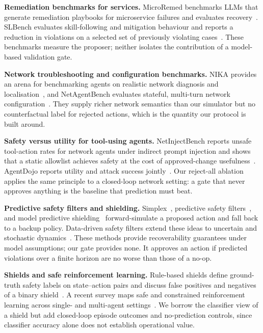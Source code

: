 \documentclass[conference]{IEEEtran}
\begin{document}
\textbf{Remediation benchmarks for services.} MicroRemed benchmarks LLMs that generate remediation playbooks for microservice failures and evaluates recovery~\cite{microremed}. SLBench evaluates skill-following and mitigation behaviour and reports a reduction in violations on a selected set of previously violating cases~\cite{slbench}. These benchmarks measure the proposer; neither isolates the contribution of a model-based validation gate.

\textbf{Network troubleshooting and configuration benchmarks.} NIKA provides an arena for benchmarking agents on realistic network diagnosis and localisation~\cite{nika}, and NetAgentBench evaluates stateful, multi-turn network configuration~\cite{netagentbench}. They supply richer network semantics than our simulator but no counterfactual label for rejected actions, which is the quantity our protocol is built around.

\textbf{Safety versus utility for tool-using agents.} NetInjectBench reports unsafe tool-action rates for network agents under indirect prompt injection and shows that a static allowlist achieves safety at the cost of approved-change usefulness~\cite{netinjectbench}. AgentDojo reports utility and attack success jointly~\cite{agentdojo}. Our reject-all ablation applies the same principle to a closed-loop network setting: a gate that never approves anything is the baseline that prediction must beat.

\textbf{Predictive safety filters and shielding.} Simplex~\cite{bbsimplex}, predictive safety filters~\cite{wabersich}, and model predictive shielding~\cite{dmps} forward-simulate a proposed action and fall back to a backup policy. Data-driven safety filters extend these ideas to uncertain and stochastic dynamics~\cite{ddsafety}. These methods provide recoverability guarantees under model assumptions; our gate provides none. It approves an action if predicted violations over a finite horizon are no worse than those of a no-op.

\textbf{Shields and safe reinforcement learning.} Rule-based shields define ground-truth safety labels on state--action pairs and discuss false positives and negatives of a binary shield~\cite{rulebasedshield}. A recent survey maps safe and constrained reinforcement learning across single- and multi-agent settings~\cite{saferlsurvey}. We borrow the classifier view of a shield but add closed-loop episode outcomes and no-prediction controls, since classifier accuracy alone does not establish operational value.
\end{document}
